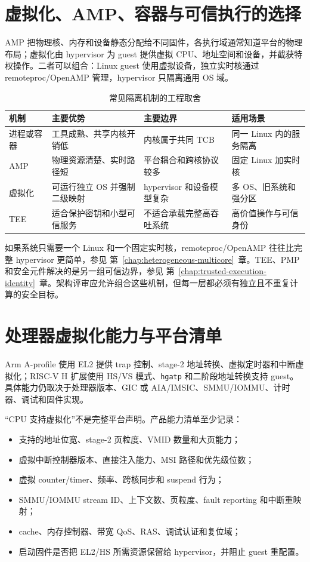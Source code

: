 \section{虚拟化、AMP、容器与可信执行的选择}

AMP 把物理核、内存和设备静态分配给不同固件，各执行域通常知道平台的物理布局；虚拟化由 hypervisor 为 guest 提供虚拟 CPU、地址空间和设备，并截获特权操作。二者可以组合：Linux guest 使用虚拟设备，独立实时核通过 remoteproc/OpenAMP 管理，hypervisor 只隔离通用 OS 域。

\begin{table}[H]
  \centering
  \caption{常见隔离机制的工程取舍}
  \begin{tabular}{p{27mm}p{35mm}p{36mm}p{38mm}}
    \hline
    机制 & 主要优势 & 主要边界 & 适用场景 \\
    \hline
    进程或容器 & 工具成熟、共享内核开销低 & 内核属于共同 TCB & 同一 Linux 内的服务隔离 \\
    AMP & 物理资源清楚、实时路径短 & 平台耦合和跨核协议较多 & 固定 Linux 加实时核 \\
    虚拟化 & 可运行独立 OS 并强制二级映射 & hypervisor 和设备模型复杂 & 多 OS、旧系统和强分区 \\
    TEE & 适合保护密钥和小型可信服务 & 不适合承载完整高吞吐系统 & 高价值操作与可信身份 \\
    \hline
  \end{tabular}
\end{table}

如果系统只需要一个 Linux 和一个固定实时核，remoteproc/OpenAMP 往往比完整 hypervisor 更简单，参见 \mbox{第~\ref{chap:heterogeneous-multicore}~章}。TEE、PMP 和安全元件解决的是另一组可信边界，参见 \mbox{第~\ref{chap:trusted-execution-identity}~章}。架构评审应允许组合这些机制，但每一层都必须有独立且不重复计算的安全目标。

\section{处理器虚拟化能力与平台清单}

Arm A-profile 使用 EL2 提供 trap 控制、stage-2 地址转换、虚拟定时器和中断虚拟化；RISC-V H 扩展使用 HS/VS 模式、\texttt{hgatp} 和二阶段地址转换支持 guest。具体能力仍取决于处理器版本、GIC 或 AIA/IMSIC、SMMU/IOMMU、计时器、调试和固件实现\cite{armrefman,riscvpri}。

“CPU 支持虚拟化”不是完整平台声明。产品能力清单至少记录：

\begin{itemize}
  \item 支持的地址位宽、stage-2 页粒度、VMID 数量和大页能力；
  \item 虚拟中断控制器版本、直接注入能力、MSI 路径和优先级位数；
  \item 虚拟 counter/timer、频率、跨核同步和 suspend 行为；
  \item SMMU/IOMMU stream ID、上下文数、页粒度、fault reporting 和中断重映射；
  \item cache、内存控制器、带宽 QoS、RAS、调试认证和复位域；
  \item 启动固件是否把 EL2/HS 所需资源保留给 hypervisor，并阻止 guest 重配置。
\end{itemize}

